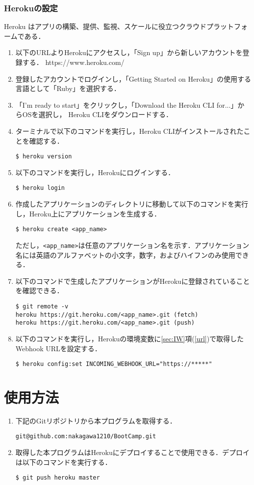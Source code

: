 \documentclass[12pt]{jsarticle}
\begin{document}
\subsubsection{Herokuの設定}\label{sec5-2-4}
Heroku はアプリの構築、提供、監視、スケールに役立つクラウドプラットフォームである．
\begin{enumerate}
\item 以下のURLよりHerokuにアクセスし，「Sign up」から新しいアカウントを登録する．
  https://www.heroku.com/
\item 登録したアカウントでログインし，「Getting Started on Heroku」の使用する言語として「Ruby」を選択する．
\item 「I'm ready to start」をクリックし，「Download the Heroku CLI for...」からOSを選択し， Heroku CLIをダウンロードする．
\item ターミナルで以下のコマンドを実行し，Heroku CLIがインストールされたことを確認する．
\begin{verbatim}
$ heroku version
\end{verbatim}
\item 以下のコマンドを実行し，Herokuにログインする．
\begin{verbatim}
$ heroku login
\end{verbatim}
\item 作成したアプリケーションのディレクトリに移動して以下のコマンドを実行し，Heroku上にアプリケーションを生成する．
\begin{verbatim}
$ heroku create <app_name>
\end{verbatim}
ただし，\verb|<app_name>|は任意のアプリケーション名を示す．アプリケーション名には英語のアルファベットの小文字，数字，およびハイフンのみ使用できる．
\item 以下のコマンドで生成したアプリケーションがHerokuに登録されていることを確認できる．
\begin{verbatim}
$ git remote -v
heroku https://git.heroku.com/<app_name>.git (fetch)
heroku https://git.heroku.com/<app_name>.git (push)
\end{verbatim}
\item 以下のコマンドを実行し，Herokuの環境変数に\ref{sec:IW}項(\ref{url})で取得したWebhook URLを設定する．\label{item8}
\begin{verbatim}
$ heroku config:set INCOMING_WEBHOOK_URL="https://*****"
\end{verbatim}
\end{enumerate}

\section{使用方法}
\begin{enumerate}
\item 下記のGitリポジトリから本プログラムを取得する．
\begin{verbatim}
git@github.com:nakagawa1210/BootCamp.git
\end{verbatim}
  \item 取得した本プログラムはHerokuにデプロイすることで使用できる．デプロイは以下のコマンドを実行する．
\begin{verbatim}
$ git push heroku master
\end{verbatim}
\end{enumerate}
\end{document}
